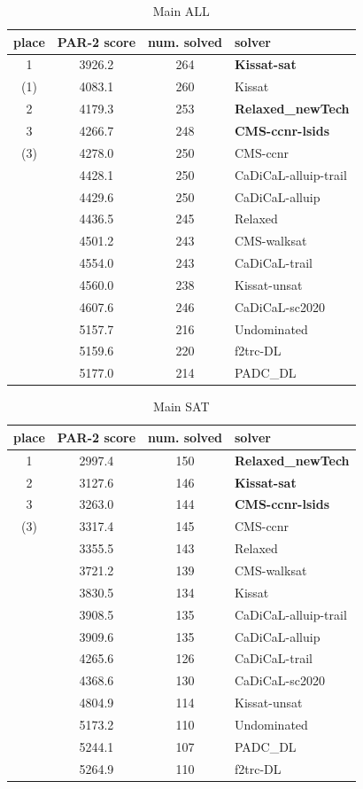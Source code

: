 \documentclass{elsarticle}
\begin{document}
\begin{table}
\caption{Main ALL}
\label{tab:mainALL}
\begin{tabular}{cccl}
place & PAR-2 score & num. solved & solver \\
\hline
1     & 3926.2 & 264 & {\bf Kissat-sat} \\
(1)   & 4083.1 & 260 & Kissat \\
2     & 4179.3 & 253 & {\bf Relaxed\_newTech} \\
3     & 4266.7 & 248 & {\bf CMS-ccnr-lsids} \\
(3)   & 4278.0 & 250 & CMS-ccnr \\
      & 4428.1 & 250 & CaDiCaL-alluip-trail \\
      & 4429.6 & 250 & CaDiCaL-alluip \\
      & 4436.5 & 245 & Relaxed \\
      & 4501.2 & 243 & CMS-walksat \\
      & 4554.0 & 243 & CaDiCaL-trail \\
      & 4560.0 & 238 & Kissat-unsat \\
      & 4607.6 & 246 & CaDiCaL-sc2020 \\
      & 5157.7 & 216 & Undominated \\
      & 5159.6 & 220 & f2trc-DL \\
      & 5177.0 & 214 & PADC\_DL \\              
\end{tabular}
\end{table}

\begin{table}
\caption{Main SAT}
\label{tab:mainSAT}
\begin{tabular}{cccl}
place & PAR-2 score & num. solved & solver \\
\hline
 1    & 2997.4 & 150 & {\bf Relaxed\_newTech} \\
 2    & 3127.6 & 146 & {\bf Kissat-sat} \\
 3    & 3263.0 & 144 & {\bf CMS-ccnr-lsids} \\
(3)   & 3317.4 & 145 & CMS-ccnr \\
      & 3355.5 & 143 & Relaxed \\
      & 3721.2 & 139 & CMS-walksat \\
      & 3830.5 & 134 & Kissat \\
      & 3908.5 & 135 & CaDiCaL-alluip-trail \\
      & 3909.6 & 135 & CaDiCaL-alluip \\
      & 4265.6 & 126 & CaDiCaL-trail \\
      & 4368.6 & 130 & CaDiCaL-sc2020 \\
   & 4804.9 & 114 & Kissat-unsat \\
   & 5173.2 & 110 & Undominated \\
   & 5244.1 & 107 & PADC\_DL \\
   & 5264.9 & 110 & f2trc-DL \\           
\end{tabular}
\end{table}
\end{document}
